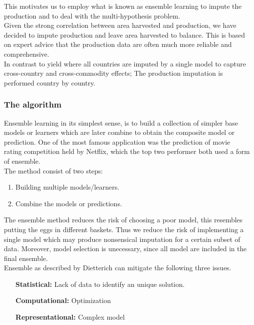 \documentclass[nojss]{jss}\usepackage[]{graphicx}\usepackage[]{color}
\begin{document}
This motivates us to employ what is known as ensemble learning to
impute the production and to deal with the multi-hypothesis
problem. \\

Given the strong correlation between area harvested and production, we
have decided to impute production and leave area harvested to balance.
This is based on expert advice that the production data are often much
more reliable and comprehensive.\\

In contrast to yield where all countries are imputed by a single model
to capture cross-country and cross-commodity effects; The production
imputation is performed country by country.\\

\subsubsection{The algorithm}
Ensemble learning in its simplest sense, is to build a collection of
simpler base models or learners which are later combine to obtain the
composite model or prediction. One of the most famous application was
the prediction of movie rating competition held by Netflix, which the
top two performer both used a form of ensemble. \\


The method consist of two steps:
\begin{enumerate}
  \item Building multiple models/learners.
  \item Combine the models or predictions.
\end{enumerate}


The ensemble method reduces the risk of choosing a poor model, this
resembles putting the eggs in different baskets. Thus we reduce the
risk of implementing a single model which may produce nonsensical
imputation for a certain subset of data. Moreover, model selection is
unecessary, since all model are included in the final ensemble.\\

Ensemble as described by Dietterich can mitigate the following
three issues.

\begin{itemize}
  \setlength{\itemindent}{1in}
  \item[\textbf{Statistical:}] Lack of data to identify an unique solution.
  \item[\textbf{Computational:}] Optimization
  \item[\textbf{Representational:}] Complex model
\end{itemize}
\end{document}

